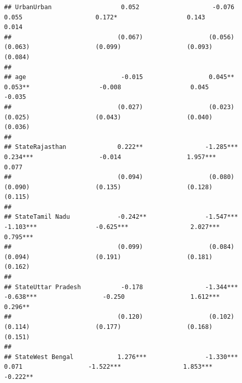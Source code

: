 \documentclass[
]{article}
\begin{document}
\begin{verbatim}
## UrbanUrban                   0.052                    -0.076                   0.055                    0.172*                   0.143                    0.014         
##                             (0.067)                  (0.056)                  (0.063)                  (0.099)                  (0.093)                  (0.084)        
##                                                                                                                                                                         
## age                          -0.015                  0.045**                  0.053**                   -0.008                   0.045                   -0.035         
##                             (0.027)                  (0.023)                  (0.025)                  (0.043)                  (0.040)                  (0.036)        
##                                                                                                                                                                         
## StateRajasthan              0.222**                 -1.285***                 0.234***                  -0.014                  1.957***                  0.077         
##                             (0.094)                  (0.080)                  (0.090)                  (0.135)                  (0.128)                  (0.115)        
##                                                                                                                                                                         
## StateTamil Nadu             -0.242**                -1.547***                -1.103***                -0.625***                 2.027***                0.795***        
##                             (0.099)                  (0.084)                  (0.094)                  (0.191)                  (0.181)                  (0.162)        
##                                                                                                                                                                         
## StateUttar Pradesh           -0.178                 -1.344***                -0.638***                  -0.250                  1.612***                 0.296**        
##                             (0.120)                  (0.102)                  (0.114)                  (0.177)                  (0.168)                  (0.151)        
##                                                                                                                                                                         
## StateWest Bengal            1.276***                -1.330***                  0.071                  -1.522***                 1.853***                -0.222**        

\end{verbatim}
\end{document}
